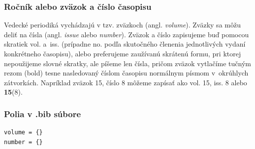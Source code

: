 \documentclass[../../../thesis.tex]{subfiles}
\begin{document}
\subsubsection*{Ročník alebo zväzok a číslo časopisu}
Vedecké periodiká vychádzajú v tzv. zväzkoch (angl. \foreignlanguage{english}{\it volume}).
Zväzky sa môžu deliť na čísla
(angl. \foreignlanguage{english}{\it issue} alebo
\foreignlanguage{english}{\it number}).
Zväzok a číslo zapisujeme buď pomocou skratiek vol. a~iss.
(prípadne no. podľa skutočného členenia jednotlivých vydaní konkrétneho časopisu),
alebo preferujeme zaužívanú skrátenú formu,
pri ktorej nepoužijeme slovné skratky,
ale píšeme len čísla,
pričom zväzok vytlačíme tučným rezom (bold)
tesne nasledovaný číslom časopisu normálnym písmom
v~okrúhlych zátvorkách.
Napríklad zväzok 15, číslo 8 môžeme zapísať
ako vol. 15, iss. 8 alebo \textbf{15}(8).

\subsubsection*{\normalsize Polia v .bib súbore}
\begin{verbatim}
volume = {}
number = {}
\end{verbatim}
\end{document}
